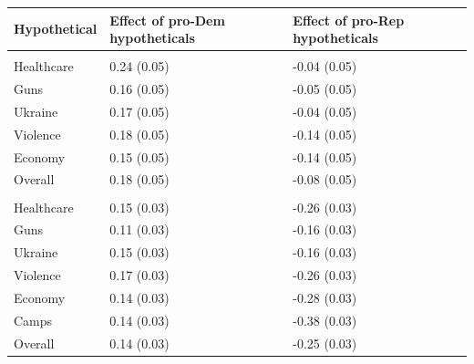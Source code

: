 
\begin{tabular}{lll}
\toprule
Hypothetical & Effect of pro-Dem hypotheticals & Effect of pro-Rep hypotheticals\\
\midrule
\addlinespace[0.3em]
\multicolumn{3}{l}{\textbf{Study 1}}\\
\hspace{1em}Healthcare & 0.24 (0.05) & -0.04 (0.05)\\
\hspace{1em}Guns & 0.16 (0.05) & -0.05 (0.05)\\
\hspace{1em}Ukraine & 0.17 (0.05) & -0.04 (0.05)\\
\hspace{1em}Violence & 0.18 (0.05) & -0.14 (0.05)\\
\hspace{1em}Economy & 0.15 (0.05) & -0.14 (0.05)\\
\hspace{1em}Overall & 0.18 (0.05) & -0.08 (0.05)\\
\addlinespace[0.3em]
\multicolumn{3}{l}{\textbf{Study 2}}\\
\hspace{1em}Healthcare & 0.15 (0.03) & -0.26 (0.03)\\
\hspace{1em}Guns & 0.11 (0.03) & -0.16 (0.03)\\
\hspace{1em}Ukraine & 0.15 (0.03) & -0.16 (0.03)\\
\hspace{1em}Violence & 0.17 (0.03) & -0.26 (0.03)\\
\hspace{1em}Economy & 0.14 (0.03) & -0.28 (0.03)\\
\hspace{1em}Camps & 0.14 (0.03) & -0.38 (0.03)\\
\hspace{1em}Overall & 0.14 (0.03) & -0.25 (0.03)\\
\bottomrule
\end{tabular}
